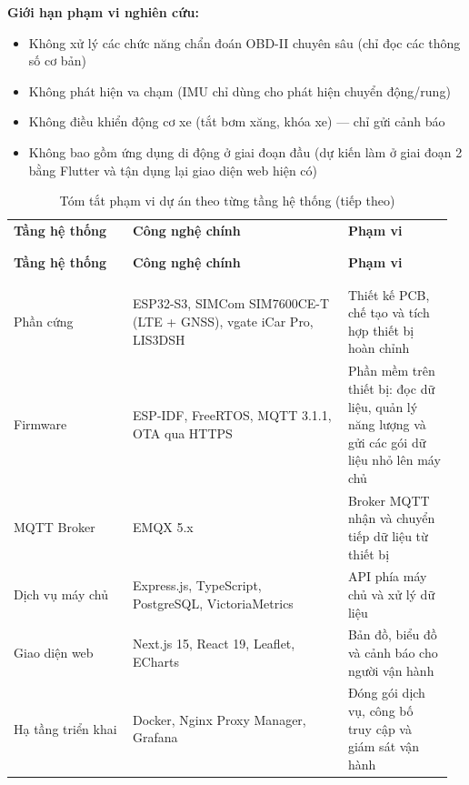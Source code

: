 \documentclass[a4paper]{extarticle}
\newcommand{\thesissettableid}[2]{%
  \renewcommand{\thetable}{#1}%
  \renewcommand{\theHtable}{#2}%
}
\providecommand{\tightlist}{%
  \setlength{\itemsep}{0pt}\setlength{\parskip}{0pt}}
\begin{document}
\textbf{Giới hạn phạm vi nghiên cứu:}

\begin{itemize}
\tightlist
\item
  Không xử lý các chức năng chẩn đoán OBD-II chuyên sâu (chỉ đọc các
  thông số cơ bản)
\item
  Không phát hiện va chạm (IMU chỉ dùng cho phát hiện chuyển động/rung)
\item
  Không điều khiển động cơ xe (tắt bơm xăng, khóa xe) --- chỉ gửi cảnh
  báo
\item
  Không bao gồm ứng dụng di động ở giai đoạn đầu (dự kiến làm ở giai
  đoạn 2 bằng Flutter và tận dụng lại giao diện web hiện có)
\end{itemize}

{\thesissettableid{1.1}{tab-ch1-project-scope-by-layer}
\def\LTcaptype{table}
\begin{longtable}{|L{0.261\linewidth}|L{0.470\linewidth}|L{0.234\linewidth}|}
\caption{Tóm tắt phạm vi dự án theo từng tầng hệ thống}\label{tab:ch1-project-scope-by-layer}\\
\hline \textbf{Tầng hệ thống} & \textbf{Công nghệ chính} & \textbf{Phạm vi} \\
\\\hline
\endfirsthead
\caption[]{Tóm tắt phạm vi dự án theo từng tầng hệ thống (tiếp theo)}\\
\hline \textbf{Tầng hệ thống} & \textbf{Công nghệ chính} & \textbf{Phạm vi} \\
\\\hline
\endhead
\\\hline
\endfoot
\endlastfoot
Phần cứng & ESP32-S3, SIMCom SIM7600CE-T (LTE + GNSS), vgate iCar Pro,
LIS3DSH & Thiết kế PCB, chế tạo và tích hợp thiết bị hoàn chỉnh \\\hline
Firmware & ESP-IDF, FreeRTOS, MQTT 3.1.1, OTA qua HTTPS & Phần mềm trên
thiết bị: đọc dữ liệu, quản lý năng lượng và gửi các gói dữ liệu nhỏ lên
máy chủ \\\hline
MQTT Broker & EMQX 5.x & Broker MQTT nhận và chuyển tiếp dữ liệu từ thiết bị \\\hline
Dịch vụ máy chủ & Express.js, TypeScript, PostgreSQL, VictoriaMetrics & API
phía máy chủ và xử lý dữ liệu \\\hline
Giao diện web & Next.js 15, React 19, Leaflet, ECharts & Bản đồ, biểu
đồ và cảnh báo cho người vận hành \\\hline
Hạ tầng triển khai & Docker, Nginx Proxy Manager, Grafana & Đóng gói
dịch vụ, công bố truy cập và giám sát vận hành \\\hline
\end{longtable}
}
\end{document}
